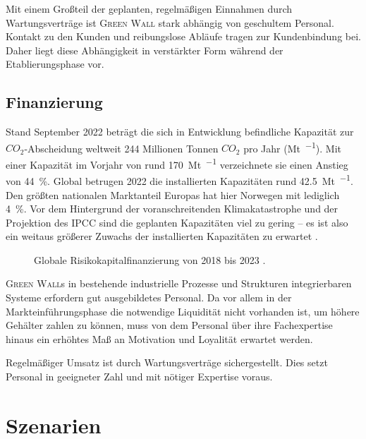 Mit einem Großteil der geplanten, regelmäßigen Einnahmen durch Wartungsverträge ist \textsc{Green Wall} stark abhängig von geschultem Personal.
Kontakt zu den Kunden und reibungslose Abläufe tragen zur Kundenbindung bei.
Daher liegt diese Abhängigkeit in verstärkter Form während der Etablierungsphase vor.\par


\subsection{Finanzierung}

Stand September 2022 beträgt die sich in Entwicklung befindliche Kapazität zur \(CO_2\)-Abscheidung weltweit \num{244} Millionen Tonnen \(CO_2\) pro Jahr (\unit{\mega\tonne\per\an}).
Mit einer Kapazität im Vorjahr von rund \qty{170}{\mega\tonne\per\an} verzeichnete sie einen Anstieg von \qty{44}{\percent}.
Global betrugen 2022 die installierten Kapazitäten rund \qty{42.5}{\mega\tonne\per\an}.
Den größten nationalen Marktanteil Europas hat hier Norwegen mit lediglich \qty{4}{\percent}.
Vor dem Hintergrund der voranschreitenden Klimakatastrophe und der Projektion des IPCC sind die geplanten Kapazitäten viel zu gering -- es ist also ein weitaus größerer Zuwachs der installierten Kapazitäten zu erwartet \cite{Book.EJR.CARBONCAPTUREUTILISATIONANDSTORAGEINTHEEUROPEANUNION.2023}.\par\medskip
%
\begin{figure}[h]
    \centering
    
    \caption[Globale Risikokapitalfinanzierung von 2018 bis 2023]{Globale Risikokapitalfinanzierung von 2018 bis 2023 \cite{Statista2022.GlobalVentureCapital}.}\label{fig:glob ccus vc inv}
\end{figure}

\textsc{Green Wall}s in bestehende industrielle Prozesse und Strukturen integrierbaren Systeme erfordern gut ausgebildetes Personal.
Da vor allem in der Markteinführungsphase die notwendige Liquidität nicht vorhanden ist, um höhere Gehälter zahlen zu können, muss von dem Personal über ihre Fachexpertise hinaus ein erhöhtes Maß an Motivation und Loyalität erwartet werden.\par\medskip

Regelmäßiger Umsatz ist durch Wartungsverträge sichergestellt.
Dies setzt Personal in geeigneter Zahl und mit nötiger Expertise voraus.

\section{Szenarien}

